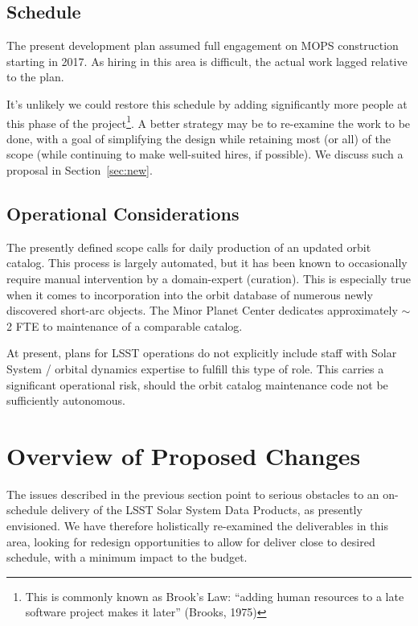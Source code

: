 \documentclass[DM,authoryear,toc,lsstdraft]{lsstdoc}
\begin{document}
\subsection{Schedule\label{sec:schedule}}

The present development plan assumed full engagement on MOPS construction starting in 2017. As hiring in this area is difficult, the actual work lagged relative to the plan.

It's unlikely we could restore this schedule by adding significantly more people at this phase of the project\footnote{This is commonly known as Brook's Law: ``adding human resources to a late software project makes it later'' (Brooks, 1975)}. A better strategy may be to re-examine the work to be done, with a goal of simplifying the design while retaining most (or all) of the scope (while continuing to make well-suited hires, if possible). We discuss such a proposal in Section~\ref{sec:new}.

\subsection{Operational Considerations}

The presently defined scope calls for daily production of an updated orbit catalog. This process is largely automated, but it has been known to occasionally require manual intervention by a domain-expert (curation). This is especially true when it comes to incorporation into the orbit database of numerous newly discovered short-arc objects. The Minor Planet Center dedicates approximately $\sim$2 FTE to maintenance of a comparable catalog.

At present, plans for LSST operations do not explicitly include staff with Solar System / orbital dynamics expertise to fulfill this type of role. This carries a significant operational risk, should the orbit catalog maintenance code not be sufficiently autonomous.

\section{Overview of Proposed Changes\label{sec:new}}

The issues described in the previous section point to serious obstacles to an on-schedule delivery of the LSST Solar System Data Products, as presently envisioned. We have therefore holistically re-examined the deliverables in this area, looking for redesign opportunities to allow for deliver close to desired schedule, with a minimum impact to the budget.
\end{document}
